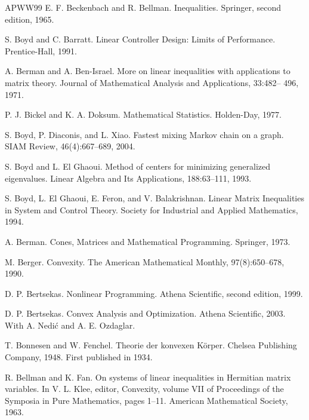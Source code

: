 \begin{thebibliography}{APWW99}
 E. F. Beckenbach and R. Bellman. Inequalities. Springer, second edition, 1965.

 S. Boyd and C. Barratt. Linear Controller Design: Limits of Performance. Prentice-Hall, 1991.

 A. Berman and A. Ben-Israel. More on linear inequalities with applications to matrix theory. Journal of Mathematical Analysis and Applications, 33:482– 496, 1971.

 P. J. Bickel and K. A. Doksum. Mathematical Statistics. Holden-Day, 1977.

 S. Boyd, P. Diaconis, and L. Xiao. Fastest mixing Markov chain on a graph. SIAM Review, 46(4):667–689, 2004.

 S. Boyd and L. El Ghaoui. Method of centers for minimizing generalized eigenvalues. Linear Algebra and Its Applications, 188:63–111, 1993.

 S. Boyd, L. El Ghaoui, E. Feron, and V. Balakrishnan. Linear Matrix Inequalities in System and Control Theory. Society for Industrial and Applied Mathematics, 1994.

 A. Berman. Cones, Matrices and Mathematical Programming. Springer, 1973.

 M. Berger. Convexity. The American Mathematical Monthly, 97(8):650–678, 1990.

 D. P. Bertsekas. Nonlinear Programming. Athena Scientific, second edition, 1999.

 D. P. Bertsekas. Convex Analysis and Optimization. Athena Scientific, 2003. With A. Nedić and A. E. Ozdaglar.

 T. Bonnesen and W. Fenchel. Theorie der konvexen Körper. Chelsea Publishing Company, 1948. First published in 1934.

 R. Bellman and K. Fan. On systems of linear inequalities in Hermitian matrix variables. In V. L. Klee, editor, Convexity, volume VII of Proceedings of the Symposia in Pure Mathematics, pages 1–11. American Mathematical Society, 1963.


\end{thebibliography}
